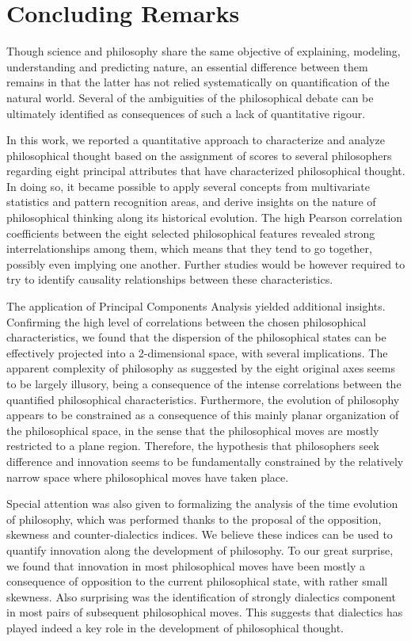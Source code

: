 \documentclass[%
 aip,
 jmp,%
 amsmath,amssymb,
 reprint,%
]{revtex4-1}
\begin{document}
\section{Concluding Remarks}

Though science and philosophy share the same objective of explaining,
modeling, understanding and predicting nature, an essential difference
between them remains in that the latter has not relied systematically
on quantification of the natural world.  Several of the ambiguities of
the philosophical debate can be ultimately identified as consequences
of such a lack of quantitative rigour.

In this work, we reported a quantitative approach to characterize and
analyze philosophical thought based on the assignment of scores to
several philosophers regarding eight principal attributes that have
characterized philosophical thought.  In doing so, it became possible
to apply several concepts from multivariate statistics and pattern
recognition areas, and derive insights on the nature of philosophical
thinking along its historical evolution.  The high Pearson correlation
coefficients between the eight selected philosophical features
revealed strong interrelationships among them, which means that they
tend to go together, possibly even implying one another.  Further
studies would be however required to try to identify causality
relationships between these characteristics.

The application of Principal Components Analysis yielded additional
insights.  Confirming the high level of correlations between the
chosen philosophical characteristics, we found that the dispersion of
the philosophical states can be effectively projected into a
2-dimensional space, with several implications.  The apparent
complexity of philosophy as suggested by the eight original axes seems
to be largely illusory, being a consequence of the intense
correlations between the quantified philosophical characteristics.
Furthermore, the evolution of philosophy appears to be constrained as
a consequence of this mainly planar organization of the philosophical
space, in the sense that the philosophical moves are mostly restricted
to a plane region. Therefore, the hypothesis that philosophers seek
difference and innovation seems to be fundamentally constrained by the
relatively narrow space where philosophical moves have taken place.

Special attention was also given to formalizing the analysis of the
time evolution of philosophy, which was performed thanks to the
proposal of the opposition, skewness and counter-dialectics indices.
We believe these indices can be used to quantify innovation along the
development of philosophy.  To our great surprise, we found that
innovation in most philosophical moves have been mostly a consequence
of opposition to the current philosophical state, with rather small
skewness.  Also surprising was the identification of strongly
dialectics component in most pairs of subsequent philosophical moves.
This suggests that dialectics has played indeed a key role in the
development of philosophical thought.
\end{document}
